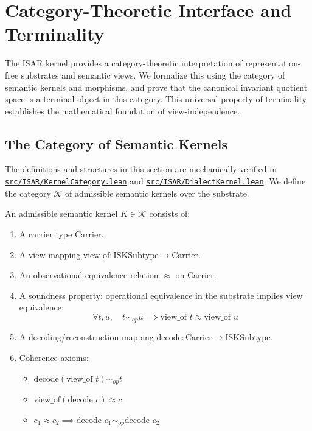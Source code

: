 \chapter{Category-Theoretic Interface and Terminality}

The ISAR kernel provides a category-theoretic interpretation of representation-free substrates and semantic views. We formalize this using the category of semantic kernels and morphisms, and prove that the canonical invariant quotient space is a terminal object in this category. This universal property of terminality establishes the mathematical foundation of view-independence.

\section{The Category of Semantic Kernels}

The definitions and structures in this section are mechanically verified in \href{https://github.com/cypoe/isar-proofs/blob/master/src/ISAR/KernelCategory.lean}{\texttt{src/ISAR/KernelCategory.lean}} and \href{https://github.com/cypoe/isar-proofs/blob/master/src/ISAR/DialectKernel.lean}{\texttt{src/ISAR/DialectKernel.lean}}. We define the category $\mathcal{K}$ of admissible semantic kernels over the substrate.

\begin{definition}
An admissible semantic kernel $K \in \mathcal{K}$ consists of:
\begin{enumerate}
    \item A carrier type $\text{Carrier}$.
    \item A view mapping $\text{view\_of} : \text{ISKSubtype} \to \text{Carrier}$.
    \item An observational equivalence relation $\approx$ on $\text{Carrier}$.
    \item A soundness property: operational equivalence in the substrate implies view equivalence:
    $$\forall t, u, \quad t \sim_{op} u \implies \text{view\_of } t \approx \text{view\_of } u$$
    \item A decoding/reconstruction mapping $\text{decode} : \text{Carrier} \to \text{ISKSubtype}$.
    \item Coherence axioms:
    \begin{itemize}
        \item $\text{decode}(\text{view\_of } t) \sim_{op} t$
        \item $\text{view\_of}(\text{decode } c) \approx c$
        \item $c_1 \approx c_2 \implies \text{decode } c_1 \sim_{op} \text{decode } c_2$
    \end{itemize}
\end{enumerate}
\end{definition}


